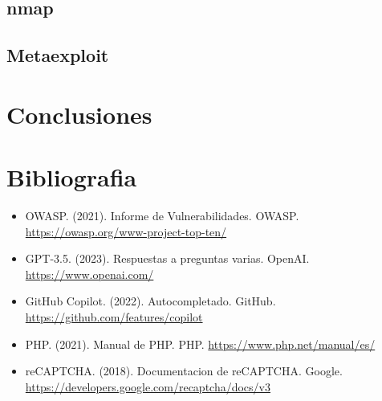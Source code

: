 \documentclass{report}
\begin{document}
        \section{nmap}
        \clearpage
        \section{Metaexploit}
        \clearpage
    \chapter{Conclusiones}
    \chapter{Bibliografia}
        \begin{itemize}
            \item OWASP. (2021). Informe de Vulnerabilidades. OWASP. \url{https://owasp.org/www-project-top-ten/}
            \item GPT-3.5. (2023). Respuestas a preguntas varias. OpenAI. \url{https://www.openai.com/}
            \item GitHub Copilot. (2022). Autocompletado. GitHub. \url{https://github.com/features/copilot}
            \item PHP. (2021). Manual de PHP. PHP. \url{https://www.php.net/manual/es/}
            \item reCAPTCHA. (2018). Documentacion de reCAPTCHA. Google. \url{https://developers.google.com/recaptcha/docs/v3}
        \end{itemize}
\end{document}
